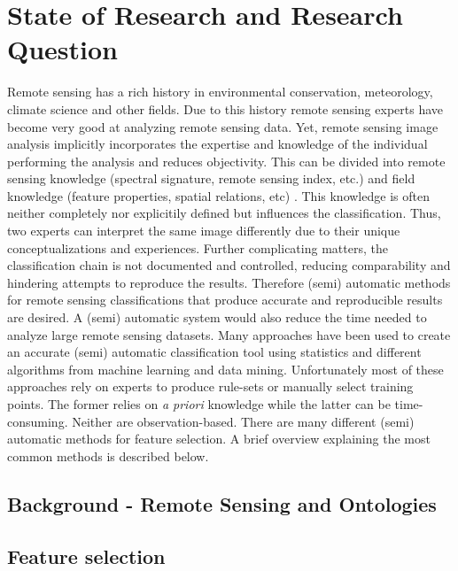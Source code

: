 \documentclass[a4paper,12pt]{article}
\begin{document}
\section{State of Research and Research Question}
Remote sensing has a rich history in environmental conservation, meteorology,
climate science and other fields. Due to this history remote sensing experts
have become very good at analyzing remote sensing data. Yet, remote sensing
image analysis implicitly incorporates the expertise and knowledge of the
individual performing the analysis and reduces objectivity. This can be divided
into remote sensing knowledge (spectral signature, remote sensing index, etc.)
and field knowledge (feature properties, spatial relations, etc)
\cite{Andres2013a}. This knowledge is often neither completely nor explicitily
defined but influences the classification. Thus, two experts can interpret the
same image differently due to their unique conceptualizations and experiences.
Further complicating matters, the classification chain is not documented and
controlled, reducing comparability and hindering attempts to reproduce the
results\cite{Arvor2013}. Therefore (semi) automatic methods for remote sensing
classifications that produce accurate and reproducible results are desired.
A (semi) automatic system would also reduce the time needed to analyze large
remote sensing datasets. Many approaches have been used to create an accurate
(semi) automatic classification tool using statistics and different algorithms
from machine learning and data mining. Unfortunately most of these approaches
rely on experts to produce rule-sets or manually select training points. The
former relies on \emph{a priori} knowledge while the latter can be
time-consuming.
Neither are observation-based. There are many different (semi) automatic methods
for feature selection. A brief overview explaining the most common methods is
described below.

\subsection{Background - Remote Sensing and Ontologies}

\subsection{Feature selection}
\end{document}
